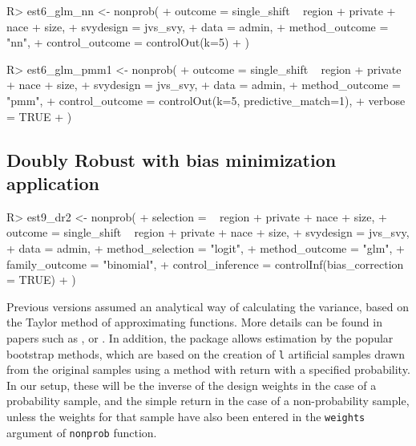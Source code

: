 \documentclass[
]{jss}
\begin{document}
\begin{CodeChunk}
\begin{CodeInput}
R> est6_glm_nn <- nonprob(
+   outcome = single_shift ~ region + private + nace + size,
+   svydesign = jvs_svy,
+   data = admin,
+   method_outcome = "nn",
+   control_outcome = controlOut(k=5)
+ )
\end{CodeInput}
\end{CodeChunk}

\begin{CodeChunk}
\begin{CodeInput}
R> est6_glm_pmm1 <- nonprob(
+   outcome = single_shift ~ region + private + nace + size,
+   svydesign = jvs_svy,
+   data = admin,
+   method_outcome = "pmm",
+   control_outcome = controlOut(k=5, predictive_match=1),
+   verbose = TRUE
+ )
\end{CodeInput}
\end{CodeChunk}

\hypertarget{doubly-robust-with-bias-minimization-application}{%
\subsection{Doubly Robust with bias minimization
application}\label{doubly-robust-with-bias-minimization-application}}

\begin{CodeChunk}
\begin{CodeInput}
R> est9_dr2 <- nonprob(
+   selection = ~ region + private + nace + size,
+   outcome = single_shift ~ region + private + nace + size,
+   svydesign = jvs_svy,
+   data = admin,
+   method_selection = "logit",
+   method_outcome = "glm",
+   family_outcome = "binomial",
+   control_inference = controlInf(bias_correction = TRUE)
+ )
\end{CodeInput}
\end{CodeChunk}

Previous versions assumed an analytical way of calculating the variance,
based on the Taylor method of approximating functions. More details can
be found in papers such as \cite{chen2020doubly},
\cite{yang_asymptotic_2020} or \cite{yang2021integration}. In addition,
the package allows estimation by the popular bootstrap methods, which
are based on the creation of \texttt{l} artificial samples drawn from
the original samples using a method with return with a specified
probability. In our setup, these will be the inverse of the design
weights in the case of a probability sample, and the simple return in
the case of a non-probability sample, unless the weights for that sample
have also been entered in the \texttt{weights} argument of
\texttt{nonprob} function.
\end{document}
